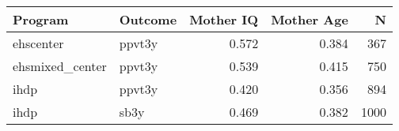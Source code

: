 \begin{table}[ht]
\centering
\begin{tabular}{llrrr}
  \hline
Program & Outcome & Mother IQ & Mother Age & N \\ 
  \hline
ehscenter & ppvt3y & 0.572 & 0.384 & 367 \\ 
  ehsmixed\_center & ppvt3y & 0.539 & 0.415 & 750 \\ 
  ihdp & ppvt3y & 0.420 & 0.356 & 894 \\ 
  ihdp & sb3y & 0.469 & 0.382 & 1000 \\ 
   \hline
\end{tabular}
\end{table}
